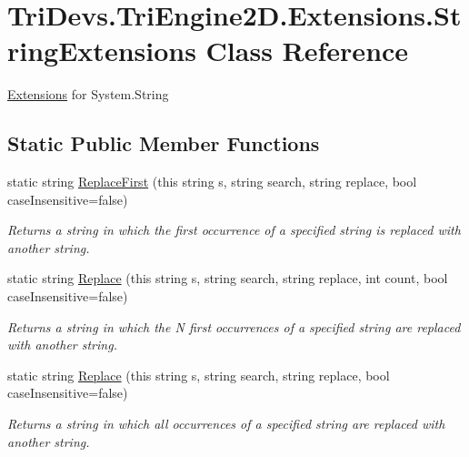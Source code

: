 \hypertarget{class_tri_devs_1_1_tri_engine2_d_1_1_extensions_1_1_string_extensions}{\section{Tri\-Devs.\-Tri\-Engine2\-D.\-Extensions.\-String\-Extensions Class Reference}
\label{class_tri_devs_1_1_tri_engine2_d_1_1_extensions_1_1_string_extensions}
}


\hyperlink{namespace_tri_devs_1_1_tri_engine2_d_1_1_extensions}{Extensions} for System.\-String  


\subsection*{Static Public Member Functions}
\begin{DoxyCompactItemize}
\item 
static string \hyperlink{class_tri_devs_1_1_tri_engine2_d_1_1_extensions_1_1_string_extensions_ae01a3219ba8f9715bdfe813b5ecd095c}{Replace\-First} (this string s, string search, string replace, bool case\-Insensitive=false)
\begin{DoxyCompactList}\small\item\em Returns a string in which the first occurrence of a specified string is replaced with another string. \end{DoxyCompactList}\item 
static string \hyperlink{class_tri_devs_1_1_tri_engine2_d_1_1_extensions_1_1_string_extensions_af13fed608d3d1dbd6d9adff7acb177a2}{Replace} (this string s, string search, string replace, int count, bool case\-Insensitive=false)
\begin{DoxyCompactList}\small\item\em Returns a string in which the N first occurrences of a specified string are replaced with another string. \end{DoxyCompactList}\item 
static string \hyperlink{class_tri_devs_1_1_tri_engine2_d_1_1_extensions_1_1_string_extensions_a893fc7ddd1bfad51febc3db33a163edc}{Replace} (this string s, string search, string replace, bool case\-Insensitive=false)
\begin{DoxyCompactList}\small\item\em Returns a string in which all occurrences of a specified string are replaced with another string. \end{DoxyCompactList}\end{DoxyCompactItemize}


